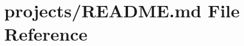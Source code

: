 \hypertarget{projects_2README_8md}{}\section{projects/\+R\+E\+A\+D\+ME.md File Reference}
\label{projects_2README_8md}
